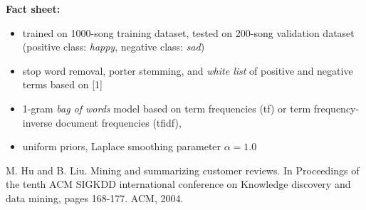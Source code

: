 \documentclass{article}
\begin{document}
\textbf{Fact sheet:}

\begin{itemize}

\item trained on 1000-song training dataset, tested on 200-song validation dataset (positive class: \emph{happy}, negative class: \emph{sad})
\item stop word removal, porter stemming, and \emph{white list} of positive and negative terms based on [1]
\item 1-gram \emph{bag of words} model based on term frequencies (tf) or term frequency-inverse document frequencies (tfidf),
\item uniform priors, Laplace smoothing parameter $\alpha=1.0$

\end{itemize}

\noindent [1] M. Hu and B. Liu. Mining and summarizing customer reviews. In Proceedings of the tenth ACM SIGKDD international conference on Knowledge discovery and data mining, pages 168-177. ACM, 2004.
\end{document}

